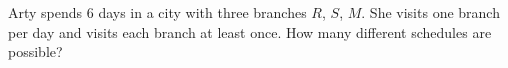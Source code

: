 Arty spends $6$ days in a city with three branches $R$, $S$, $M$. She visits one branch per day and visits each branch at least once. How many different schedules are possible?
